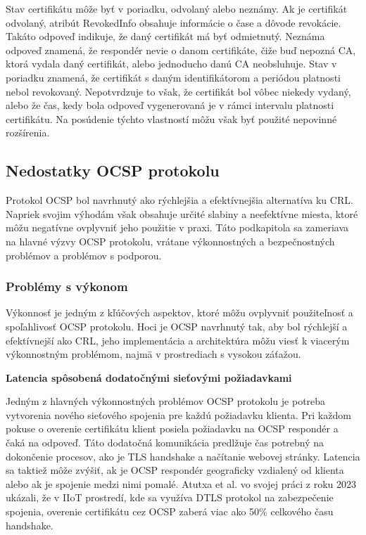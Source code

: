 \documentclass[12pt, twoside]{book}
\newcommand{\subsubsubsection}[1]{%
  \vspace{0.2em}  
  \textbf{#1} \\[0.2em]
  \hspace*{\parindent}
}
\begin{document}
Stav certifikátu môže byť v poriadku, odvolaný alebo neznámy. Ak je certifikát odvolaný, atribút RevokedInfo obsahuje informácie o čase a dôvode revokácie. Takáto odpoveď indikuje, že daný certifikát má byť odmietnutý. Neznáma odpoveď znamená, že respondér nevie o danom certifikáte, čiže buď nepozná CA, ktorá vydala daný certifikát, alebo jednoducho danú CA neobsluhuje. Stav v poriadku znamená, že certifikát s daným identifikátorom a periódou platnosti nebol revokovaný. Nepotvrdzuje to však, že certifikát bol vôbec niekedy vydaný, alebo že čas, kedy bola odpoveď vygenerovaná je v rámci intervalu platnosti certifikátu. Na posúdenie týchto vlastností môžu však byť použité nepovinné rozšírenia.\cite{rfc6960}

\subsection{Nedostatky OCSP protokolu}
Protokol OCSP bol navrhnutý ako rýchlejšia a efektívnejšia alternatíva ku CRL. Napriek svojim výhodám však obsahuje určité slabiny a neefektívne miesta, ktoré môžu negatívne ovplyvniť jeho použitie v praxi. Táto podkapitola sa zameriava na hlavné výzvy OCSP protokolu, vrátane výkonnostných a bezpečnostných problémov a problémov s podporou.

\subsubsection{Problémy s výkonom}
Výkonnosť je jedným z kľúčových aspektov, ktoré môžu ovplyvniť použiteľnosť a spoľahlivosť OCSP protokolu. Hoci je OCSP navrhnutý tak, aby bol rýchlejší a efektívnejší ako CRL, jeho implementácia a architektúra môžu viesť k viacerým výkonnostným problémom, najmä v prostrediach s vysokou záťažou.

\subsubsubsection{Latencia spôsobená dodatočnými sieťovými požiadavkami}
Jedným z hlavných výkonnostných problémov OCSP protokolu je potreba vytvorenia nového sieťového spojenia pre každú požiadavku klienta. Pri každom pokuse o overenie certifikátu klient posiela požiadavku na OCSP respondér a čaká na odpoveď. Táto dodatočná komunikácia predlžuje čas potrebný na dokončenie procesov, ako je TLS handshake a načítanie webovej stránky. Latencia sa taktiež môže zvýšiť, ak je OCSP respondér geograficky vzdialený od klienta alebo ak je spojenie medzi nimi pomalé. Atutxa et al. vo svojej práci z roku 2023 ukázali, že v IIoT prostredí, kde sa využíva DTLS protokol na zabezpečenie spojenia, overenie certifikátu cez OCSP zaberá viac ako 50\% celkového času handshake.\cite{atutxa}
\end{document}
